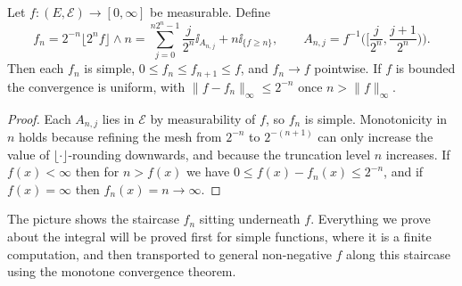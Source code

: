 \documentclass[a4paper]{scrartcl}
\newcommand{\cE}{\mathcal{E}}
\newcommand{\ind}{\ii}
\begin{document}
\begin{proposition}\label{prop:std-approx}
	Let $f : (E,\cE) \to [0,\infty]$ be measurable. Define
	$$
	f_n = 2^{-n}\lfloor 2^n f \rfloor \wedge n = \sum_{j=0}^{n2^n - 1} \frac{j}{2^n}\ind_{A_{n,j}} + n \ind_{\{f \geq n\}}, \qquad A_{n,j} = f^{-1}\Big( \Big[ \frac{j}{2^n}, \frac{j+1}{2^n}\Big)\Big).
	$$
	Then each $f_n$ is simple, $0 \leq f_n \leq f_{n+1} \leq f$, and $f_n \to f$ pointwise. If $f$ is bounded the convergence is uniform, with $\|f - f_n\|_\infty \leq 2^{-n}$ once $n > \|f\|_\infty$.
\end{proposition}
\begin{proof}
	Each $A_{n,j}$ lies in $\cE$ by measurability of $f$, so $f_n$ is simple. Monotonicity in $n$ holds because refining the mesh from $2^{-n}$ to $2^{-(n+1)}$ can only increase the value of $\lfloor \cdot \rfloor$-rounding downwards, and because the truncation level $n$ increases. If $f(x) < \infty$ then for $n > f(x)$ we have $0 \leq f(x) - f_n(x) \leq 2^{-n}$, and if $f(x) = \infty$ then $f_n(x) = n \to \infty$.
\end{proof}

\begin{center}
\end{center}

The picture shows the staircase $f_n$ sitting underneath $f$. Everything we prove about the integral will be proved first for simple functions, where it is a finite computation, and then transported to general non-negative $f$ along this staircase using the monotone convergence theorem.
\end{document}
